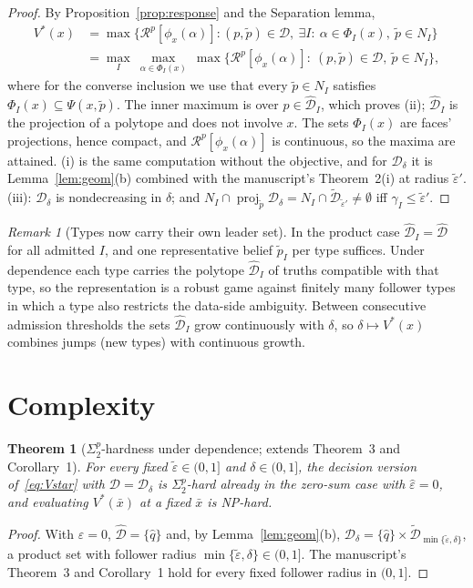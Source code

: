 \documentclass[11pt]{article}
\newtheorem{theorem}{Theorem}
\theoremstyle{definition}
\theoremstyle{remark}
\newtheorem{remark}{Remark}
\newcommand{\D}{\mathcal{D}}
\newcommand{\Dh}{\hat{\mathcal{D}}}
\newcommand{\Dt}{\tilde{\mathcal{D}}}
\newcommand{\tp}{\tilde{p}}
\newcommand{\heps}{\hat{\varepsilon}}
\newcommand{\teps}{\tilde{\varepsilon}}
\newcommand{\R}{\mathcal{R}}
\DeclareMathOperator{\proj}{proj}
\begin{document}
\begin{proof}
By Proposition~\ref{prop:response} and the Separation lemma,
\[
\begin{aligned}
  V^*(x)&=\max\Big\{\R^p[\phi_x(\alpha)]:(p,\tp)\in\D,\ \exists I:\ \alpha\in\Phi_I(x),\ \tp\in N_I\Big\}\\
  &=\max_I\ \max_{\alpha\in\Phi_I(x)}\ \max\big\{\R^p[\phi_x(\alpha)]:\ (p,\tp)\in\D,\ \tp\in N_I\big\},
\end{aligned}
\]
where for the converse inclusion we use that every $\tp\in N_I$ satisfies $\Phi_I(x)\subseteq\Psi(x,\tp)$. The inner maximum is over $p\in\Dh_I$, which proves (ii); $\Dh_I$ is the projection of a polytope and does not involve $x$. The sets $\Phi_I(x)$ are faces' projections, hence compact, and $\R^p[\phi_x(\alpha)]$ is continuous, so the maxima are attained. (i) is the same computation without the objective, and for $\D_\delta$ it is Lemma~\ref{lem:geom}(b) combined with the manuscript's Theorem~2(i) at radius $\teps'$. (iii): $\D_\delta$ is nondecreasing in $\delta$; and $N_I\cap\proj_{\tp}\D_\delta=N_I\cap\Dt_{\teps'}\ne\emptyset$ iff $\gamma_I\le\teps'$.
\end{proof}

\begin{remark}[Types now carry their own leader set]
In the product case $\Dh_I=\Dh$ for all admitted $I$, and one representative belief $\tp_I$ per type suffices. Under dependence each type carries the polytope $\Dh_I$ of truths compatible with that type, so the representation is a robust game against finitely many follower types in which a type also restricts the data-side ambiguity. Between consecutive admission thresholds the sets $\Dh_I$ grow continuously with $\delta$, so $\delta\mapsto V^*(x)$ combines jumps (new types) with continuous growth.
\end{remark}

\section{Complexity}

\begin{theorem}[$\Sigma_2^p$-hardness under dependence; extends Theorem~3 and Corollary~1]\label{thm:hard}
For every fixed $\teps\in(0,1]$ and $\delta\in(0,1]$, the decision version of~\eqref{eq:Vstar} with $\D=\D_\delta$ is $\Sigma_2^p$-hard already in the zero-sum case with $\heps=0$, and evaluating $V^*(\bar x)$ at a fixed $\bar x$ is NP-hard.
\end{theorem}
\begin{proof}
With $\heps=0$, $\Dh=\{\hat q\}$ and, by Lemma~\ref{lem:geom}(b), $\D_\delta=\{\hat q\}\times\Dt_{\min\{\teps,\delta\}}$, a product set with follower radius $\min\{\teps,\delta\}\in(0,1]$. The manuscript's Theorem~3 and Corollary~1 hold for every fixed follower radius in $(0,1]$.
\end{proof}
\end{document}
